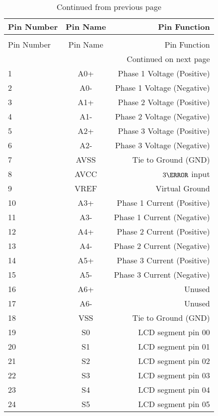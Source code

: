 {
\begin{longtable}[c]{|l|c|r|}
\caption{MSP430F47197 Pinout}\\
\hline
\rowcolor{lightgray}
  Pin Number & Pin Name & Pin Function\\ \hline\hline
\endfirsthead

\caption[]{Continued from previous page}\\
\hline
\rowcolor{lightgray}
  Pin Number & Pin Name & Pin Function\\ \hline\hline
\endhead

\multicolumn{3}{r}{{Continued on next page}} \\
\endfoot

\endlastfoot

  1 & A0+ & Phase 1 Voltage (Positive) \\
  2 & A0- & Phase 1 Voltage (Negative) \\
  3 & A1+ & Phase 2 Voltage (Positive) \\
  4 & A1- & Phase 2 Voltage (Negative) \\
  5 & A2+ & Phase 3 Voltage (Positive) \\
  6 & A2- & Phase 3 Voltage (Negative) \\
  7 & AVSS & Tie to Ground (GND) \\
  8 & AVCC & $3\volt$ input \\
  9 & VREF & Virtual Ground \\
  10 & A3+ & Phase 1 Current (Positive) \\ \hline
  11 & A3- & Phase 1 Current (Negative) \\
  12 & A4+ & Phase 2 Current (Positive) \\
  13 & A4- & Phase 2 Current (Negative) \\
  14 & A5+ & Phase 3 Current (Positive) \\
  15 & A5- & Phase 3 Current (Negative) \\
  16 & A6+ & Unused \\
  17 & A6- & Unused \\
  18 & VSS & Tie to Ground (GND) \\
  19 & S0 & LCD segment pin 00 \\
  20 & S1 & LCD segment pin 01 \\ \hline
  21 & S2 & LCD segment pin 02 \\
  22 & S3 & LCD segment pin 03 \\
  23 & S4 & LCD segment pin 04 \\
  24 & S5 & LCD segment pin 05 \\

\end{longtable}}
